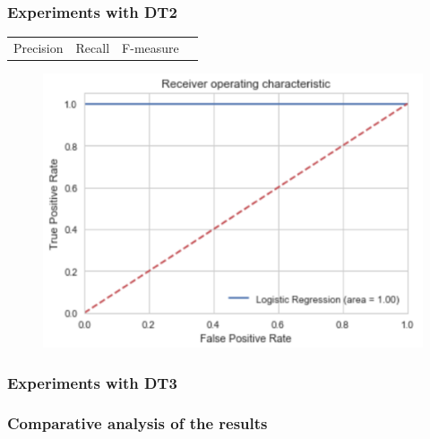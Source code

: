 \subsubsection{Experiments with DT2}


\begin{table}[h]
\centering
\begin{tabular}{cccc}
Precision & Recall & F-measure & \\
\end{tabular}
\end{table}

\begin{figure}
\includegraphics[width=.8\textwidth]{images/curve_roc_dt2}
\end{figure}
\subsubsection{Experiments with DT3}
\subsubsection{Comparative analysis of the results}
